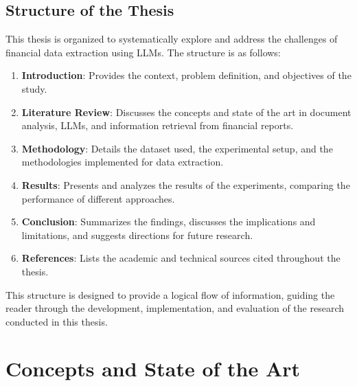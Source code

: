 \documentclass[english, 12pt, a4paper, elec, utf8, a-2b, online]{aaltothesis}
\begin{document}
\subsection{Structure of the Thesis}

This thesis is organized to systematically explore and address the challenges of financial data extraction using \acp{LLM}. The structure is as follows:
\begin{enumerate}
\item \textbf{Introduction}: Provides the context, problem definition, and objectives of the study.
\item \textbf{Literature Review}: Discusses the concepts and state of the art in document analysis, \ac{LLM}s, and information retrieval from financial reports.
\item \textbf{Methodology}: Details the dataset used, the experimental setup, and the methodologies implemented for data extraction.
\item \textbf{Results}: Presents and analyzes the results of the experiments, comparing the performance of different approaches.
\item \textbf{Conclusion}: Summarizes the findings, discusses the implications and limitations, and suggests directions for future research.
\item \textbf{References}: Lists the academic and technical sources cited throughout the thesis.
\end{enumerate}

This structure is designed to provide a logical flow of information, guiding the reader through the development, implementation, and evaluation of the research conducted in this thesis.

\clearpage
\section{Concepts and State of the Art}
\end{document}

